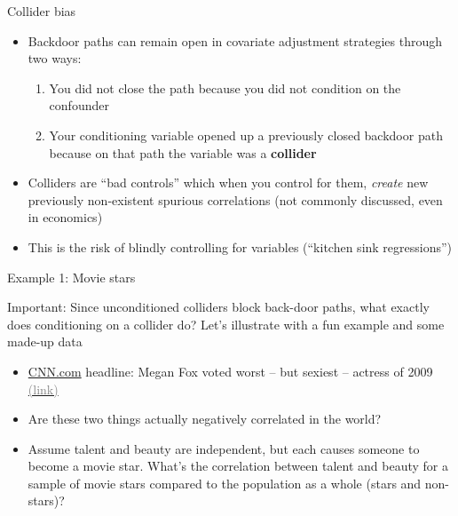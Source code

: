 \documentclass{beamer}
\newcommand{\myurlshort}[2]{\href{#1}{\textcolor{gray}{\textsf{#2}}}}
\begin{document}
\begin{frame}{Collider bias}

\begin{itemize}
\item Backdoor paths can remain open in covariate adjustment strategies through two ways:
	\begin{enumerate}
	\item You did not close the path because you did not condition on the confounder
	\item Your conditioning variable opened up a previously closed backdoor path because on that path the variable was a \textbf{collider}
	\end{enumerate}
\item Colliders are ``bad controls'' which when you control for them, \emph{create} new previously non-existent spurious correlations (not commonly discussed, even in economics)
\item This is the risk of blindly controlling for variables (``kitchen sink regressions'')
\end{itemize}

\end{frame}


\begin{frame}{Example 1: Movie stars}

  \alert{Important}: Since unconditioned colliders block back-door paths, what exactly does conditioning on a collider do? Let's illustrate with a fun example and some made-up data\\
  \begin{itemize}
    \item \underline{CNN.com} headline: Megan Fox voted worst -- but sexiest -- actress of 2009 \myurlshort{http://marquee.blogs.cnn.com/2009/12/30/megan-fox-voted-worst-but-sexiest-actress-of-2009/}{(link)}
    \item Are these two things actually negatively correlated in the world?
    \item Assume talent and beauty are independent, but each causes someone to become a movie star.  What's the correlation between talent and beauty for a sample of movie stars compared to the population as a whole (stars and non-stars)?
  \end{itemize}

\end{frame}
\end{document}
